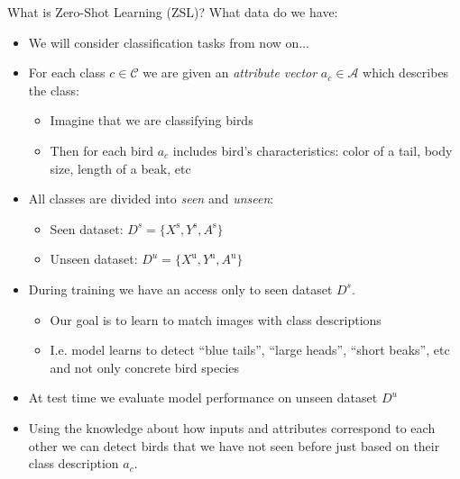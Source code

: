\documentclass[10pt]{beamer}
\begin{document}
\begin{frame}{What is Zero-Shot Learning (ZSL)?}
What data do we have:
    \begin{itemize}
        \item\pause We will consider classification tasks from now on...
        \item\pause For each class $c \in \mathcal{C}$ we are given an \textit{attribute vector} $a_c \in \mathcal{A}$ which describes the class:
            \begin{itemize}
                \item\pause Imagine that we are classifying birds
                \item\pause Then for each bird $a_c$ includes bird's characteristics: color of a tail, body size, length of a beak, etc
            \end{itemize}
        \item\pause All classes are divided into \textit{seen} and \textit{unseen}:
            \begin{itemize}
                \item\pause Seen dataset: $D^s = \{X^{\text{s}}, Y^{\text{s}}, A^\text{s}\}$
                \item\pause Unseen dataset: $D^u = \{X^{\text{u}}, Y^{\text{u}}, A^\text{u}\}$
            \end{itemize}
    
    \item\pause During training we have an access only to seen dataset $D^s$.
    \begin{itemize}
        \item\pause Our goal is to learn to match images with class descriptions
        \item\pause I.e. model learns to detect ``blue tails'', ``large heads'', ``short beaks'', etc and not only concrete bird species
    \end{itemize}
    \item\pause At test time we evaluate model performance on unseen dataset $D^u$
    \item\pause Using the knowledge about how inputs and attributes correspond to each other we can detect birds that we have not seen before just based on their class description $a_c$.
\end{itemize}
\end{frame}
\end{document}
